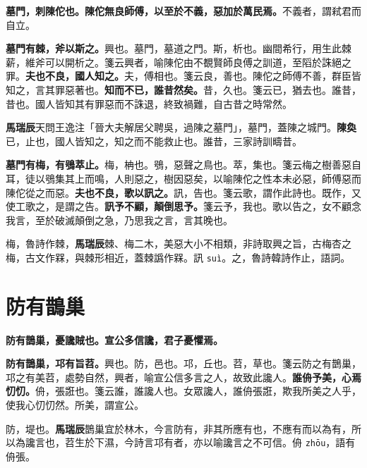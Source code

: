 \textbf{墓門，刺陳佗也。陳佗無良師傅，以至於不義，惡加於萬民焉。}{\footnotesize 不義者，謂弒君而自立。}

\textbf{墓門有棘，斧以斯之。}{\footnotesize 興也。墓門，墓道之門。斯，析也。幽間希行，用生此棘薪，維斧可以開析之。箋云興者，喻陳佗由不覩賢師良傅之訓道，至䧟於誅絕之罪。}\textbf{夫也不良，國人知之。}{\footnotesize 夫，傅相也。箋云良，善也。陳佗之師傅不善，群臣皆知之，言其罪惡著也。}\textbf{知而不已，誰昔然矣。}{\footnotesize 昔，久也。箋云已，猶去也。誰昔，昔也。國人皆知其有罪惡而不誅退，終致禍難，自古昔之時常然。}

\begin{quoting}\textbf{馬瑞辰}天問王逸注「晉大夫解居父聘吳，過陳之墓門」，墓門，蓋陳之城門。\textbf{陳奐}已，止也，國人皆知之，知之而不能救止也。誰昔，三家詩訓疇昔。\end{quoting}

\textbf{墓門有梅，有鴞萃止。}{\footnotesize 梅，柟也。鴞，惡聲之鳥也。萃，集也。箋云梅之樹善惡自耳，徒以鴞集其上而鳴，人則惡之，樹因惡矣，以喻陳佗之性本未必惡，師傅惡而陳佗從之而惡。}\textbf{夫也不良，歌以訊之。}{\footnotesize 訊，告也。箋云歌，謂作此詩也。既作，又使工歌之，是謂之告。}\textbf{訊予不顧，顛倒思予。}{\footnotesize 箋云予，我也。歌以告之，女不顧念我言，至於破滅顛倒之急，乃思我之言，言其晚也。}

\begin{quoting}梅，魯詩作棘，\textbf{馬瑞辰}棘、梅二木，美惡大小不相類，非詩取興之旨，古梅杏之梅，古文作槑，與棘形相近，蓋棘譌作槑。訊 \texttt{suì}。之，魯詩韓詩作止，語詞。\end{quoting}

\section{防有鵲巢}


\textbf{防有鵲巢，憂讒賊也。宣公多信讒，君子憂懼焉。}

\textbf{防有鵲巢，邛有旨苕。}{\footnotesize 興也。防，邑也。邛，丘也。苕，草也。箋云防之有鵲巢，邛之有美苕，處勢自然，興者，喻宣公信多言之人，故致此讒人。}\textbf{誰侜予美，心焉忉忉。}{\footnotesize 侜，張誑也。箋云誰，誰讒人也。女眾讒人，誰侜張誑，欺我所美之人乎，使我心忉忉然。所美，謂宣公。}

\begin{quoting}防，堤也。\textbf{馬瑞辰}鵲巢宜於林木，今言防有，非其所應有也，不應有而以為有，所以為讒言也，苕生於下濕，今詩言邛有者，亦以喻讒言之不可信。侜 \texttt{zhōu}，語有侜張。\end{quoting}


